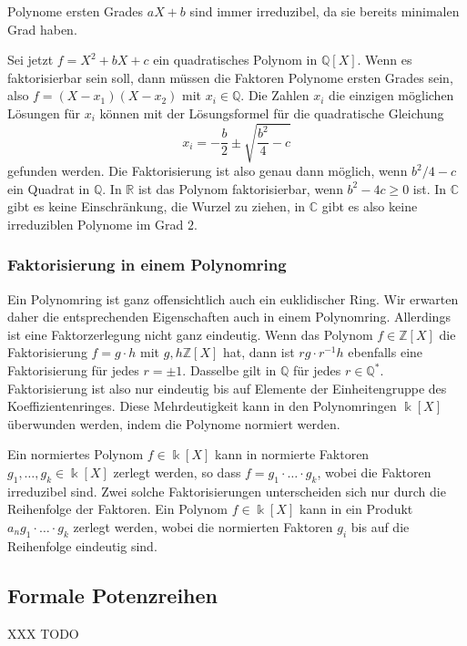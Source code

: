 \begin{beispiel}
Polynome ersten Grades $aX+b$ sind immer irreduzibel, da sie bereits
minimalen Grad haben.

Sei jetzt $f=X^2+bX+c$ ein quadratisches Polynom in $\mathbb{Q}[X]$.
Wenn es faktorisierbar sein soll, dann müssen die Faktoren Polynome
ersten Grades sein, also $f=(X-x_1)(X-x_2)$ mit $x_i\in\mathbb{Q}$.
Die Zahlen $x_i$ die einzigen möglichen Lösungen für $x_i$ können mit
der Lösungsformel für die quadratische Gleichung
\[
x_i = -\frac{b}2\pm\sqrt{\frac{b^2}{4}-c}
\]
gefunden werden.
Die Faktorisierung ist also genau dann möglich, wenn $b^2/4-c$ ein 
Quadrat in $\mathbb{Q}$.
In $\mathbb{R}$ ist das Polynom faktorisierbar, wenn $b^2-4c\ge 0$ ist.
In $\mathbb{C}$ gibt es keine Einschränkung, die Wurzel zu ziehen,
in $\mathbb{C}$ gibt es also keine irreduziblen Polynome im Grad $2$.
\end{beispiel}

\subsubsection{Faktorisierung in einem Polynomring}
Ein Polynomring ist ganz offensichtlich auch ein euklidischer Ring.
Wir erwarten daher die entsprechenden Eigenschaften auch in einem
Polynomring.
Allerdings ist eine Faktorzerlegung nicht ganz eindeutig.
Wenn das Polynom $f\in\mathbb{Z}[X]$ die Faktorisierung
$f=g\cdot h$ mit $g,h\mathbb{Z}[X]$ hat, dann
ist $rg\cdot r^{-1}h$ ebenfalls eine Faktorisierung für jedes $r =\pm1$.
Dasselbe gilt in $\mathbb{Q}$ für jedes $r\in \mathbb{Q}^*$.
Faktorisierung ist also nur eindeutig bis auf Elemente der
Einheitengruppe des Koeffizientenringes.
Diese Mehrdeutigkeit kann in den Polynomringen $\Bbbk[X]$ 
überwunden werden, indem die Polynome normiert werden.

\begin{satz}
Ein normiertes Polynom $f\in \Bbbk[X]$ kann in
normierte Faktoren $g_1,\dots,g_k\in\Bbbk[X]$ zerlegt werden, so dass
$f=g_1\cdot\ldots\cdot g_k$, wobei die Faktoren irreduzibel sind.
Zwei solche Faktorisierungen unterscheiden sich nur durch die Reihenfolge
der Faktoren.
Ein Polynom $f\in \Bbbk[X]$ kann in ein Produkt $a_n g_1\cdot\ldots\cdot g_k$
zerlegt werden, wobei die normierten Faktoren $g_i$ bis auf die Reihenfolge
eindeutig sind.
\end{satz}


%
%
\subsection{Formale Potenzreihen
\label{buch:subsection:polynome:potenzreihen}}
XXX TODO



